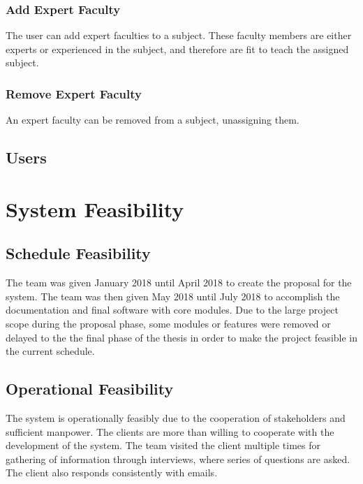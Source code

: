         \subsubsection{Add Expert Faculty}
        The user can add expert faculties to a subject. These faculty members are either experts or experienced in the subject, and therefore are fit to teach the assigned subject.
        
        \subsubsection{Remove Expert Faculty}
        An expert faculty can be removed from a subject, unassigning them.
    
    \subsection{Users}
    
\section{System Feasibility}

\subsection{Schedule Feasibility}
The team was given January 2018 until April 2018 to create the proposal for the system. The team was then given May 2018 until July 2018 to accomplish the documentation and final software with core modules. Due to the large project scope during the proposal phase, some modules or features were removed or delayed to the the final phase of the thesis in order to make the project feasible in the current schedule.

\subsection{Operational Feasibility}
The system is operationally feasibly due to the cooperation of stakeholders and sufficient manpower. The clients are more than willing to cooperate with the development of the system. The team visited the client multiple times for gathering of information through interviews, where series of questions are asked. The client also responds consistently with emails.

